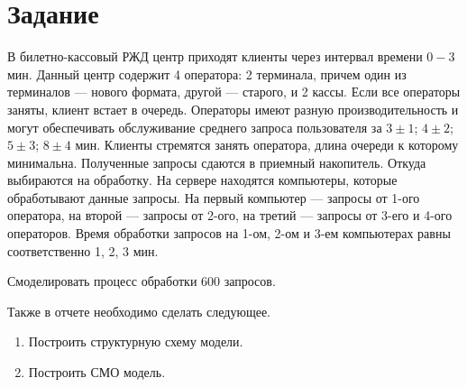 \chapter{Задание}

В билетно-кассовый РЖД центр приходят клиенты через интервал времени $0-3$
мин. 
Данный центр содержит 4 оператора: 2 терминала, причем один из терминалов --- нового формата, другой --- старого, и 2 кассы. Если все операторы заняты, клиент встает в очередь. Операторы имеют разную производительность и могут
обеспечивать обслуживание среднего запроса пользователя за $3 \pm 1$; $4 \pm 2$; $5 \pm 3$; $8 \pm 4$ мин. Клиенты стремятся занять оператора, длина очереди к которому минимальна. Полученные запросы сдаются в приемный накопитель. Откуда
выбираются на обработку. На сервере находятся компьютеры, которые обработывают данные запросы. На первый компьютер --- запросы от 1-ого
оператора, на второй --- запросы от 2-ого, на третий --- запросы от 3-его и 4-ого операторов. Время обработки запросов на 1-ом, 2-ом и 3-ем компьютерах равны соответственно 1, 2, 3 мин. 

Смоделировать процесс обработки 600 запросов.

Также в отчете необходимо сделать следующее.
\begin{enumerate}
    \item Построить структурную схему модели.
    \item Построить СМО модель.
\end{enumerate}
